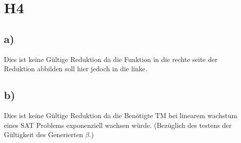 \section*{H4}

\subsection*{a)}

Dies ist keine Gültige Reduktion da die Funktion in die rechte seite der Reduktion abbilden soll hier jedoch in die linke.

\subsection*{b)}

Dies ist keine Gültige Reduktion da die Benötigte TM bei linearem wachstum eines SAT Problems exponenziell wachsen würde. (Bezüglich des testens der Gültigkeit des Generierten $\beta$.)
